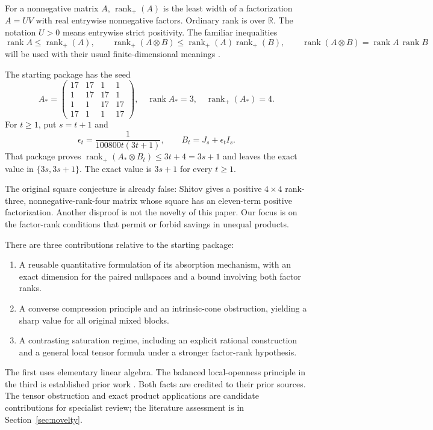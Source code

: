 \documentclass[11pt]{article}
\theoremstyle{definition}\newtheorem{definition}[theorem]{Definition}
\theoremstyle{remark}\newtheorem{remark}[theorem]{Remark}
\newcommand{\rk}{\operatorname{rank}}
\newcommand{\rp}{\operatorname{rank}_{+}}
\newcommand{\R}{\mathbb R}
\begin{document}
For a nonnegative matrix $A$, $\rp(A)$ is the least width of a factorization $A=UV$ with real entrywise nonnegative factors. Ordinary rank is over $\R$. The notation $U>0$ means entrywise strict positivity. The familiar inequalities
\[
\rk A\le\rp(A),\qquad
\rp(A\otimes B)\le\rp(A)\rp(B),\qquad
\rk(A\otimes B)=\rk A\,\rk B
\]
will be used with their usual finite-dimensional meanings \cite{CR,VGGT}.

The starting package \cite{Goyal} has the seed
\begin{equation}\label{eq:oldseed}
A_* = \begin{pmatrix}17&17&1&1\\1&17&17&1\\1&1&17&17\\17&1&1&17\end{pmatrix},
\quad \rk A_*=3,\quad \rp(A_*)=4.
\end{equation}
For $t\ge1$, put $s=t+1$ and
\begin{equation}\label{eq:oldaux}
\epsilon_t=\frac1{100800t(3t+1)},\qquad B_t=J_s+\epsilon_tI_s.
\end{equation}
That package proves $\rp(A_*\otimes B_t)\le3t+4=3s+1$ and leaves the exact value in $\{3s,3s+1\}$. The exact value is $3s+1$ for every $t\ge1$.

The original square conjecture is already false: Shitov \cite{Shitov26} gives a positive $4\times4$ rank-three, nonnegative-rank-four matrix whose square has an eleven-term positive factorization. Another disproof is not the novelty of this paper. Our focus is on the factor-rank conditions that permit or forbid savings in unequal products.

There are three contributions relative to the starting package:
\begin{enumerate}
\item A reusable quantitative formulation of its absorption mechanism, with an exact dimension for the paired nullspaces and a bound involving both factor ranks.
\item A converse compression principle and an intrinsic-cone obstruction, yielding a sharp value for all original mixed blocks.
\item A contrasting saturation regime, including an explicit rational construction and a general local tensor formula under a stronger factor-rank hypothesis.
\end{enumerate}
The first uses elementary linear algebra. The balanced local-openness principle in the third is established prior work \cite{Behrends,NR}. Both facts are credited to their prior sources. The tensor obstruction and exact product applications are candidate contributions for specialist review; the literature assessment is in Section~\ref{sec:novelty}.
\end{document}
